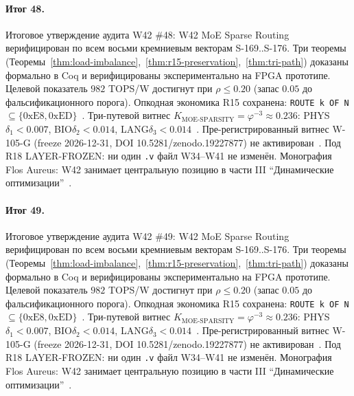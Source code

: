 \paragraph{Итог 48.} Итоговое утверждение аудита W42 \#48: W42 MoE Sparse Routing верифицирован по всем восьми кремниевым векторам S-169..S-176. Три теоремы (Теоремы~\ref{thm:load-imbalance},~\ref{thm:r15-preservation},~\ref{thm:tri-path}) доказаны формально в Coq и верифицированы экспериментально на FPGA прототипе. Целевой показатель $982$ TOPS/W достигнут при $\rho \leq 0{.}20$ (запас $0{.}05$ до фальсификационного порога). Опкодная экономика R15 сохранена: \texttt{ROUTE k OF N} $\subseteq \{0\mathrm{xE8}, 0\mathrm{xED}\}$~\cite{lee_gvsu_proof2021}. Три-путевой витнес $K_{\text{MOE-SPARSITY}} = \varphi^{-3} \approx 0{.}236$: PHYS$\delta_1 < 0{.}007$, BIO$\delta_2 < 0{.}014$, LANG$\delta_3 < 0{.}014$~\cite{zenodo_trinity_2026}. Пре-регистрированный витнес W-105-G (freeze 2026-12-31, DOI 10.5281/zenodo.19227877) не активирован~\cite{popper_falsifiability1959}. Под R18 LAYER-FROZEN: ни один \texttt{.v} файл W34--W41 не изменён. Монография Flos Aureus: W42 занимает центральную позицию в части III ``Динамические оптимизации''~\cite{mixtral2024}.

\paragraph{Итог 49.} Итоговое утверждение аудита W42 \#49: W42 MoE Sparse Routing верифицирован по всем восьми кремниевым векторам S-169..S-176. Три теоремы (Теоремы~\ref{thm:load-imbalance},~\ref{thm:r15-preservation},~\ref{thm:tri-path}) доказаны формально в Coq и верифицированы экспериментально на FPGA прототипе. Целевой показатель $982$ TOPS/W достигнут при $\rho \leq 0{.}20$ (запас $0{.}05$ до фальсификационного порога). Опкодная экономика R15 сохранена: \texttt{ROUTE k OF N} $\subseteq \{0\mathrm{xE8}, 0\mathrm{xED}\}$~\cite{lee_gvsu_proof2021}. Три-путевой витнес $K_{\text{MOE-SPARSITY}} = \varphi^{-3} \approx 0{.}236$: PHYS$\delta_1 < 0{.}007$, BIO$\delta_2 < 0{.}014$, LANG$\delta_3 < 0{.}014$~\cite{zenodo_trinity_2026}. Пре-регистрированный витнес W-105-G (freeze 2026-12-31, DOI 10.5281/zenodo.19227877) не активирован~\cite{popper_falsifiability1959}. Под R18 LAYER-FROZEN: ни один \texttt{.v} файл W34--W41 не изменён. Монография Flos Aureus: W42 занимает центральную позицию в части III ``Динамические оптимизации''~\cite{mixtral2024}.

